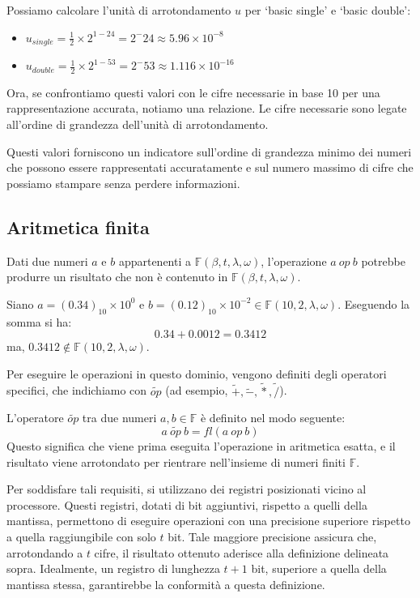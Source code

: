 \documentclass{article}
\begin{document}
Possiamo calcolare l'unità di arrotondamento $u$ per `basic single' e `basic
double':
\begin{itemize}
    \item $u_{single}= \frac{1}{2} \times 2^{1-24}=2^-24\approx 5.96 \times
        10 ^{-8}$ 
    \item $u_{double}= \frac{1}{2} \times 2^{1-53}=2^-53\approx 1.116 \times
        10 ^{-16}$ 
\end{itemize}
Ora, se confrontiamo questi valori con le cifre necessarie in base 10 per
una rappresentazione accurata, notiamo una relazione. Le cifre necessarie
sono legate all'ordine di grandezza dell'unità di arrotondamento.

Questi valori forniscono un indicatore sull'ordine di grandezza minimo dei 
numeri che possono essere rappresentati accuratamente e sul numero massimo di 
cifre che possiamo stampare senza perdere informazioni.
\subsection{Aritmetica finita}
Dati due numeri $a$ e $b$ appartenenti a $\mathbb{F}(\beta,t,\lambda,\omega)$,
l'operazione $a\ op\ b$ potrebbe produrre un risultato che non è contenuto in
$\mathbb{F}(\beta,t,\lambda,\omega)$.
\begin{example}
    Siano $a=(0.34)_{10}\times10^{0}$ e $b=(0.12)_{10}\times10^{-2}\in
    \mathbb{F}(10,2,\lambda,\omega)$. Eseguendo la somma si ha: 
    $$0.34+0.0012=0.3412$$
    ma, $0.3412\notin \mathbb{F}(10,2,\lambda,\omega)$.
\end{example}
Per eseguire le operazioni in questo dominio, vengono definiti degli
operatori specifici, che indichiamo con $\tilde{op}$ (ad esempio, $\tilde{+},
\tilde{-}, \tilde{*}, \tilde{/}$).
\begin{definition}
    L'operatore $\tilde{op}$ tra due numeri $a,b\in \mathbb{F}$ è definito nel modo seguente:
    $$a\ \tilde{op}\ b=fl(a\ op\ b)$$
    Questo significa che viene prima eseguita l'operazione in aritmetica
    esatta, e il risultato viene arrotondato per rientrare nell'insieme di
    numeri finiti $\mathbb{F}$.
\end{definition}
Per soddisfare tali requisiti, si utilizzano dei registri posizionati vicino 
al processore. Questi registri, dotati di bit aggiuntivi, 
rispetto a quelli della mantissa, permettono di eseguire operazioni con una
precisione superiore rispetto a quella raggiungibile con solo $t$ bit. Tale
maggiore precisione assicura che, arrotondando a $t$ cifre, il risultato ottenuto
aderisce alla definizione delineata sopra. Idealmente, un registro di lunghezza
$t+1$ bit, superiore a quella della mantissa stessa, garantirebbe la
conformità a questa definizione.
\vskip 0.1in
\end{document}
